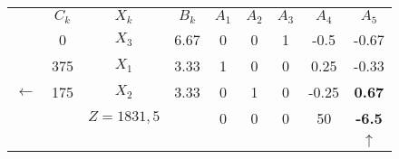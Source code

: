 \begin{tabular}{ccccccccc}
\cline{2-9}       & $C_k$  & $X_k$  & $B_k$  & $A_1$  & $A_2$  & $A_3$  & $A_4$  & $A_5$ \bigstrut\\
\cline{2-9}       & 0      & $X_3$  & 6.67   & 0      & 0      & 1      & -0.5   & -0.67 \bigstrut[t]\\
       & 375    & $X_1$  & 3.33   & 1      & 0      & 0      & 0.25   & -0.33 \\
$\leftarrow$ & 175    & \textcolor[rgb]{ 1,  0,  0}{\boldmath{}\textbf{$X_2$}\unboldmath{}} & 3.33   & 0      & 1      & 0      & -0.25  & \textbf{0.67} \bigstrut[b]\\
\cline{2-9}       &        & $Z=1831,5$ &        & 0      & 0      & 0      & 50     & \textcolor[rgb]{ 0,  .439,  .753}{\textbf{-6.5}} \bigstrut\\
\cline{2-9}       &        &        &        &        &        &        &        & $\uparrow$ \bigstrut[t]\\
\end{tabular}%

